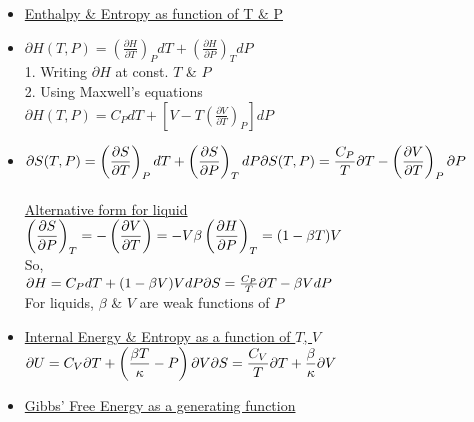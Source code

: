 \documentclass[12pt]{article}
\begin{document}
\begin{itemize}
	\item \underline{Enthalpy \& Entropy as function of T \& P}
	\item $\displaystyle \partial H(T,P)=\left(\right)_PdT+ \left(\right)_TdP$\\
	1. Writing $\partial H$ at const. $T$ \& $P$\\
	2. Using Maxwell's equations\\
	$\displaystyle \partial H(T,P)=C_PdT+dP$
	\item $\displaystyle \partial S(T,P)=\left(\right)_PdT+\left(\right)_TdP\\
	\partial S(T,P)= \partial T-\left(\right)_P\partial P$\\ \\
	\underline{Alternative form for liquid}\\
	$\displaystyle \left(\right)_T=-\left(\right)=-V\beta\\
	\left(\right)_T=(1-\beta T)V$\\
	So,\\
	$\partial H=C_PdT+(1-\beta V)VdP\\
	\partial S=\partial T-\beta VdP$\\
	For liquids, $\beta$ \& $V$ are weak functions of $P$
	\item \underline{Internal Energy \& Entropy as a function of $T$, $V$}\\
	$\displaystyle \partial U= C_V\partial T+\left(-P\right)\partial V\\
	\partial S=\partial T+\frac{\beta}{\kappa}\partial V$
	\item \underline{Gibbs' Free Energy as a generating function}\\

\end{itemize}
\end{document}
